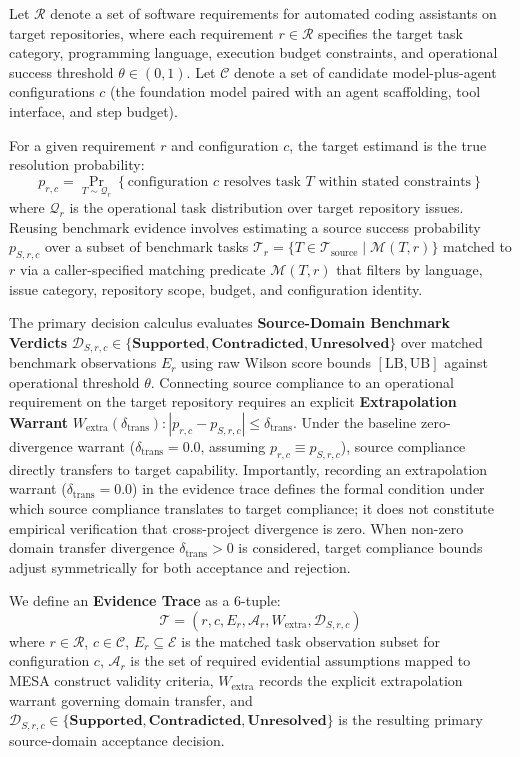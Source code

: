 \documentclass[runningheads]{llncs}
\begin{document}
Let $\mathcal{R}$ denote a set of software requirements for automated coding assistants on target repositories, where each requirement $r \in \mathcal{R}$ specifies the target task category, programming language, execution budget constraints, and operational success threshold $\theta \in (0, 1)$. Let $\mathcal{C}$ denote a set of candidate model-plus-agent configurations $c$ (the foundation model paired with an agent scaffolding, tool interface, and step budget). 

For a given requirement $r$ and configuration $c$, the target estimand is the true resolution probability:
\begin{equation}
\label{eq:estimand}
p_{r,c} = \Pr_{T \sim \mathcal{Q}_r} \left\{ \text{configuration } c \text{ resolves task } T \text{ within stated constraints} \right\}
\end{equation}
where $\mathcal{Q}_r$ is the operational task distribution over target repository issues. Reusing benchmark evidence involves estimating a source success probability $p_{S,r,c}$ over a subset of benchmark tasks $\mathcal{T}_r = \{ T \in \mathcal{T}_{\text{source}} \mid \mathcal{M}(T, r) \}$ matched to $r$ via a caller-specified matching predicate $\mathcal{M}(T, r)$ that filters by language, issue category, repository scope, budget, and configuration identity. 

The primary decision calculus evaluates \textbf{Source-Domain Benchmark Verdicts} $\mathcal{D}_{S,r,c} \in \{ \textbf{Supported}, \textbf{Contradicted}, \textbf{Unresolved} \}$ over matched benchmark observations $E_r$ using raw Wilson score bounds $[\text{LB}, \text{UB}]$ against operational threshold $\theta$. Connecting source compliance to an operational requirement on the target repository requires an explicit \textbf{Extrapolation Warrant} $W_{\text{extra}}(\delta_{\text{trans}}): |p_{r,c} - p_{S,r,c}| \le \delta_{\text{trans}}$. Under the baseline zero-divergence warrant ($\delta_{\text{trans}} = 0.0$, assuming $p_{r,c} \equiv p_{S,r,c}$), source compliance directly transfers to target capability. Importantly, recording an extrapolation warrant ($\delta_{\text{trans}} = 0.0$) in the evidence trace defines the formal condition under which source compliance translates to target compliance; it does not constitute empirical verification that cross-project divergence is zero. When non-zero domain transfer divergence $\delta_{\text{trans}} > 0$ is considered, target compliance bounds adjust symmetrically for both acceptance and rejection.

We define an \textbf{Evidence Trace} as a 6-tuple:
\begin{equation}
\label{eq:trace}
\mathcal{T} = \left( r, c, E_r, \mathcal{A}_r, W_{\text{extra}}, \mathcal{D}_{S,r,c} \right)
\end{equation}
where $r \in \mathcal{R}$, $c \in \mathcal{C}$, $E_r \subseteq \mathcal{E}$ is the matched task observation subset for configuration $c$, $\mathcal{A}_r$ is the set of required evidential assumptions mapped to MESA construct validity criteria, $W_{\text{extra}}$ records the explicit extrapolation warrant governing domain transfer, and $\mathcal{D}_{S,r,c} \in \{ \textbf{Supported}, \textbf{Contradicted}, \textbf{Unresolved} \}$ is the resulting primary source-domain acceptance decision.
\end{document}
